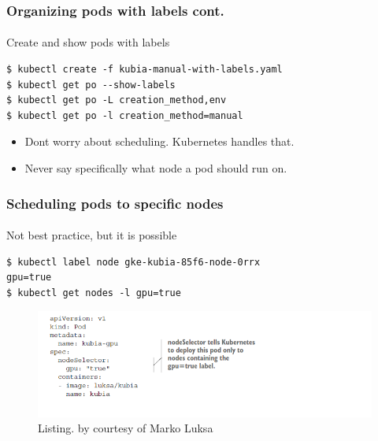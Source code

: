 \begin{frame}[fragile]
	\frametitle{Organizing pods with labels cont.}
	\framesubtitle{}
	Create and show pods with labels
	\begin{lstlisting}[numbers=none, basicstyle=\ttfamily]
$ kubectl create -f kubia-manual-with-labels.yaml
$ kubectl get po --show-labels
$ kubectl get po -L creation_method,env
$ kubectl get po -l creation_method=manual
	\end{lstlisting}
	\begin{itemize}
		\item Dont worry about scheduling. Kubernetes handles that.
		\item Never say specifically what node a pod should run on.
	\end{itemize}
\end{frame}


\begin{frame}[fragile]
	\frametitle{Scheduling pods to specific nodes}
	\framesubtitle{}
	Not best practice, but it is possible
	\begin{lstlisting}[numbers=none, basicstyle=\ttfamily]
$ kubectl label node gke-kubia-85f6-node-0rrx
gpu=true
$ kubectl get nodes -l gpu=true
	\end{lstlisting}
	\begin{figure}[htbp!]
		\includegraphics[width=1\textwidth]{listings/3_4.png}
		\caption{Listing. by courtesy of Marko Luksa\cite{Luksa2018}}
		\label{fig:}
	\end{figure}
\end{frame}

